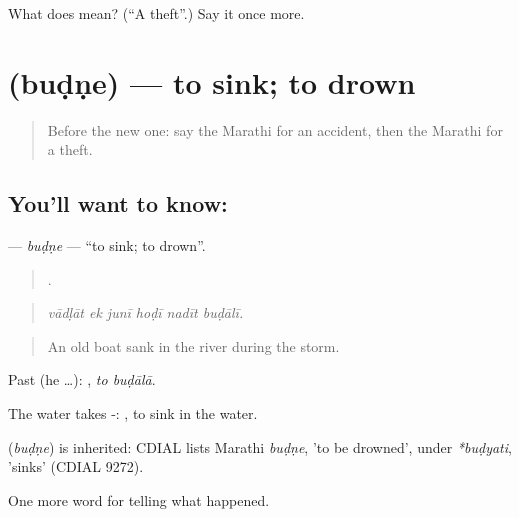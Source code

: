 \begin{tcolorbox}[breakable,colback=teal!4,colframe=teal!35!black,title={Before you move on}]
What does  mean? (\textquotedblleft{}A theft\textquotedblright{}.) Say it once more.
\end{tcolorbox}
\section[\texorpdfstring{\mr{बुडणे} (buḍṇe)}{बुडणे (buḍṇe)}]{ (buḍṇe) — to sink; to drown}

\label{lesson:MR-C288-budne}



\begin{quote}
Before the new one: say the Marathi for an accident, then the Marathi for a theft.
\end{quote}

\subsection*{You'll want to know: }
\textbf{} — \emph{buḍṇe} — \textquotedblleft{}to sink; to drown\textquotedblright{}.

\begin{quote}
     .
\end{quote}

\begin{quote}
\emph{vādḷāt ek junī hoḍī nadīt buḍālī.}
\end{quote}

\begin{quote}
An old boat sank in the river during the storm.
\end{quote}

Past (he …):  , \emph{to buḍālā}.

The water takes -:  , to sink in the water.

\begin{cousinweb}
\textbf{} (\emph{buḍṇe}) is inherited: CDIAL lists Marathi \emph{buḍṇe}, 'to be drowned', under \emph{*buḍyati}, 'sinks' (CDIAL 9272).
\end{cousinweb}

\begin{grammarlens}[title={What you've built}]
One more word for telling what happened.
\end{grammarlens}

